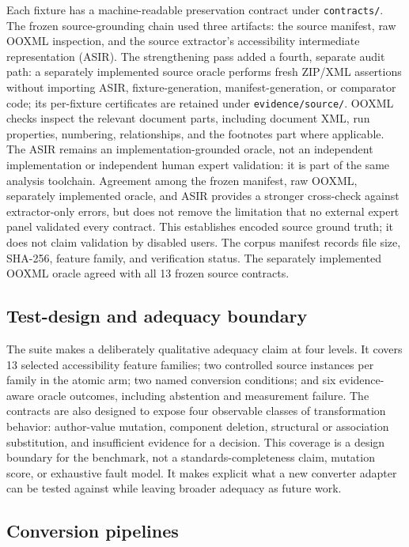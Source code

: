 Each fixture has a machine-readable preservation contract under \texttt{contracts/}. The frozen source-grounding chain used three artifacts: the source manifest, raw OOXML inspection, and the source extractor's accessibility intermediate representation (ASIR). The strengthening pass added a fourth, separate audit path: a separately implemented source oracle performs fresh ZIP/XML assertions without importing ASIR, fixture-generation, manifest-generation, or comparator code; its per-fixture certificates are retained under \texttt{evidence/source/}. OOXML checks inspect the relevant document parts, including document XML, run properties, numbering, relationships, and the footnotes part where applicable. The ASIR remains an implementation-grounded oracle, not an independent implementation or independent human expert validation: it is part of the same analysis toolchain. Agreement among the frozen manifest, raw OOXML, separately implemented oracle, and ASIR provides a stronger cross-check against extractor-only errors, but does not remove the limitation that no external expert panel validated every contract. This establishes encoded source ground truth; it does not claim validation by disabled users. The corpus manifest records file size, SHA-256, feature family, and verification status.
The separately implemented OOXML oracle agreed with all 13 frozen source contracts.

\subsection{Test-design and adequacy boundary}

The suite makes a deliberately qualitative adequacy claim at four levels. It
covers 13 selected accessibility feature families; two controlled source
instances per family in the atomic arm; two named conversion conditions;
and six evidence-aware oracle outcomes, including abstention and measurement
failure. The contracts are also designed to expose four observable classes of
transformation behavior: author-value mutation, component deletion, structural
or association substitution, and insufficient evidence for a decision. This
coverage is a design boundary for the benchmark, not a standards-completeness
claim, mutation score, or exhaustive fault model. It makes explicit what a new
converter adapter can be tested against while leaving broader adequacy as
future work.

\subsection{Conversion pipelines}


